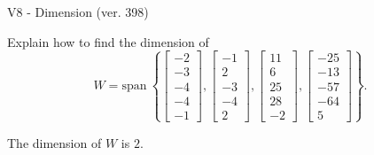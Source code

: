 \begin{exercise}
  \begin{exerciseTitle}V8 - Dimension (ver. 398)\end{exerciseTitle}
  \begin{exerciseStatement}
    Explain how to find the dimension of 
\[W=\mathrm{span}\ \left\{\left[\begin{array}{r}
-2 \\
-3 \\
-4 \\
-4 \\
-1
\end{array}\right] , \left[\begin{array}{r}
-1 \\
2 \\
-3 \\
-4 \\
2
\end{array}\right] , \left[\begin{array}{r}
11 \\
6 \\
25 \\
28 \\
-2
\end{array}\right] , \left[\begin{array}{r}
-25 \\
-13 \\
-57 \\
-64 \\
5
\end{array}\right]\right\}.\]



  \end{exerciseStatement}
  \begin{exerciseAnswer}
   The dimension of \(W\) is  \(2\).
  


  \end{exerciseAnswer}
\end{exercise}